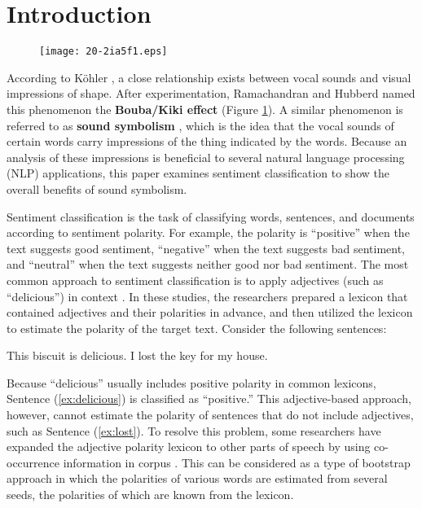 \documentclass[english]{jnlp_1.4}
\begin{document}
\maketitle

\section{Introduction}

\begin{figure}[b]
\begin{center}
\texttt{[image: 20-2ia5f1.eps]}
\end{center}
\label{f:boubakiki}
\end{figure}

According to K{\"o}hler \cite{kohler1929}, a close relationship exists between vocal sounds and visual impressions of shape.
After experimentation, Ramachandran and Hubberd \cite{ramachandran2001} named this phenomenon the {\bf Bouba/Kiki effect} (Figure \ref{f:boubakiki}).
A similar phenomenon is referred to as {\bf sound symbolism} \cite{david2008}, which is the idea that the vocal sounds of certain words carry impressions of the thing indicated by the words.
Because an analysis of these impressions is beneficial to several natural language processing (NLP) applications,
this paper examines sentiment classification to show the overall benefits of sound symbolism.

Sentiment classification is the task of classifying words, sentences, and documents according to sentiment polarity.
For example, the polarity is ``positive'' when the text suggests good sentiment, ``negative'' when the text suggests bad sentiment, and ``neutral'' when the text suggests neither good nor bad sentiment.
The most common approach to sentiment classification is to apply adjectives (such as ``delicious'') in context \cite{hu2004,kamps2004}.
In these studies, the researchers prepared a lexicon that contained adjectives and their polarities in advance, and then utilized the lexicon to estimate the polarity of the target text.
Consider the following sentences:
\begin{exe}
	\ex This biscuit is delicious.
	\label{ex:delicious}
	\ex I lost the key for my house.
	\label{ex:lost}
\end{exe}
Because ``delicious'' usually includes positive polarity in common lexicons, Sentence (\ref{ex:delicious}) is classified as ``positive.''
This adjective-based approach, however, cannot estimate the polarity of sentences that do not include adjectives, such as Sentence (\ref{ex:lost}).
To resolve this problem, some researchers have expanded the adjective polarity lexicon to other parts of speech by using co-occurrence information in corpus \cite{turney2003,takamura2005}.
This can be considered as a type of bootstrap approach in which the polarities of various words are estimated from several seeds, the polarities of which are known from the lexicon.
\end{document}
